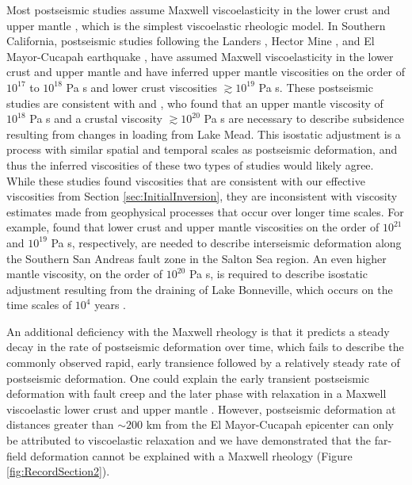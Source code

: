 \documentclass[draft,linenumbers]{AGUJournal}
\begin{document}
Most postseismic studies assume Maxwell viscoelasticity in the lower crust and upper mantle \citep[e.g.][]{Nur1974,Pollitz2000,Hetland2003,Freed2006a,Johnson2009,Hearn2009}, which is the simplest viscoelastic rheologic model.  In Southern California, postseismic studies following the Landers \citep{Pollitz2000}, Hector Mine \citep{Pollitz2001}, and El Mayor-Cucapah earthquake \citep{Spinler2015,Rollins2015}, have assumed Maxwell viscoelasticity in the lower crust and upper mantle and have inferred upper mantle viscosities on the order of $10^{17}$ to $10^{18}$ Pa s and lower crust viscosities $\gtrsim 10^{19}$ Pa s.  These postseismic studies are consistent with \citet{Kaufmann2000} and \citet{Cavalie2007}, who found that an upper mantle viscosity of $10^{18}$ Pa s and a crustal viscosity $\gtrsim10^{20}$ Pa s are necessary to describe subsidence resulting from changes in loading from Lake Mead. This isostatic adjustment is a process with similar spatial and temporal scales as postseismic deformation, and thus the inferred viscosities of these two types of studies would likely agree. While these studies found viscosities that are consistent with our effective viscosities from Section \ref{sec:InitialInversion}, they are inconsistent with viscosity estimates made from geophysical processes that occur over longer time scales. For example, \citet{Lundgren2009} found that lower crust and upper mantle viscosities on the order of $10^{21}$ and $10^{19}$ Pa s, respectively, are needed to describe interseismic deformation along the Southern San Andreas fault zone in the Salton Sea region.  An even higher mantle viscosity, on the order of $10^{20}$ Pa s, is required to describe isostatic adjustment resulting from the draining of Lake Bonneville, which occurs on the time scales of $10^{4}$ years \citep{Crittenden1967,Bills1987}.  

An additional deficiency with the Maxwell rheology is that it predicts a steady decay in the rate of postseismic deformation over time, which fails to describe the commonly observed rapid, early transience followed by a relatively steady rate of postseismic deformation.  One could explain the early transient postseismic deformation with fault creep and the later phase with relaxation in a Maxwell viscoelastic lower crust and upper mantle \citep[e.g][]{Hearn2009,Johnson2009}. However, postseismic deformation at distances greater than ${\sim}200$ km from the El Mayor-Cucapah epicenter can only be attributed to viscoelastic relaxation \citep{Freed2007a} and we have demonstrated that the far-field deformation cannot be explained with a Maxwell rheology (Figure \ref{fig:RecordSection2}).
\end{document}
